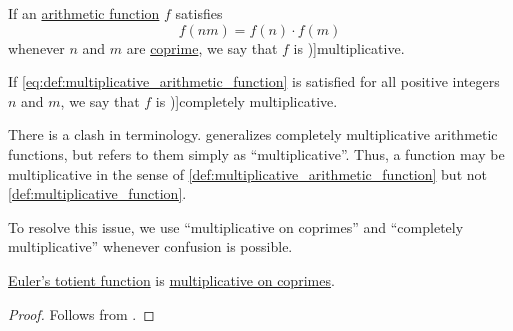 \begin{definition}\label{def:multiplicative_arithmetic_function}
  If an \hyperref[def:arithmetic_function]{arithmetic function} \( f \) satisfies
  \begin{equation}\label{eq:def:multiplicative_arithmetic_function}
    f(nm) = f(n) \cdot f(m)
  \end{equation}
  whenever \( n \) and \( m \) are \hyperref[def:coprime_numbers]{coprime}, we say that \( f \) is \term[ru=мультипликативная (функция) (\cite[def. 36]{Бухштаб1966ТеорияЧисел})]{multiplicative}.

  If \eqref{eq:def:multiplicative_arithmetic_function} is satisfied for all positive integers \( n \) and \( m \), we say that \( f \) is \term[ru=вполне мультипликативная (функция) (\cite[def. 37]{Бухштаб1966ТеорияЧисел})]{completely multiplicative}.
\end{definition}
\begin{comments}
  \item There is a clash in terminology.  generalizes completely multiplicative arithmetic functions, but refers to them simply as \enquote{multiplicative}. Thus, a function may be multiplicative in the sense of \cref{def:multiplicative_arithmetic_function} but not \cref{def:multiplicative_function}.

  To resolve this issue, we use \enquote{multiplicative on coprimes} and \enquote{completely multiplicative} whenever confusion is possible.
\end{comments}

\begin{proposition}\label{thm:totient_function_multiplicative}
  \hyperref[def:eulers_totient_function]{Euler's totient function} is \hyperref[def:multiplicative_arithmetic_function]{multiplicative on coprimes}.
\end{proposition}
\begin{proof}
  Follows from .
\end{proof}


